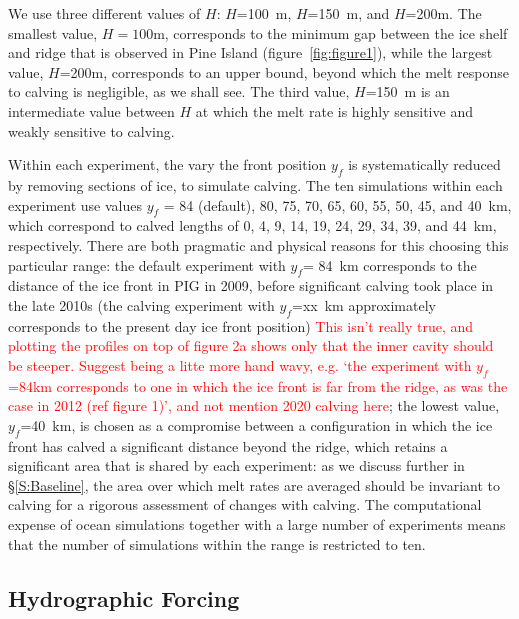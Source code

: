 \documentclass[draft]{agujournal2019}
\newcommand{\red}[1]{\textcolor{red}{#1}}
\begin{document}
We use three different values of $H$: $H$=100~m, $H$=150~m, and $H$=200m. The smallest value, $H = 100$m, corresponds to the minimum gap between the ice shelf and ridge that is observed in Pine Island (figure~\ref{fig:figure1}), while the largest value, $H$=200m, corresponds to an upper bound, beyond which the melt response to calving is negligible, as we shall see. The third value, $H$=150~m is an intermediate value between $H$ at which the melt rate is highly sensitive and weakly sensitive to calving.

Within each experiment, the vary the front position $y_f$ is systematically reduced by removing sections of ice, to simulate calving. The ten simulations within each experiment use values $y_f$ = 84 (default), 80, 75, 70, 65, 60, 55, 50, 45, and 40~km, which correspond to calved lengths of 0, 4, 9, 14, 19, 24, 29, 34, 39, and 44~km, respectively. There are both pragmatic and physical reasons for this choosing this particular range: the default experiment with $y_f$= 84~km corresponds to the distance of the ice front in PIG in 2009, before significant calving took place in the late 2010s (the calving experiment with $y_f$=xx~km approximately corresponds to the present day ice front position) \red{This isn't really true, and plotting the profiles on top of figure 2a shows only that the inner cavity should be steeper. Suggest being a litte more hand wavy, e.g. `the experiment with $y_f$=84km corresponds to one in which the ice front is far from the ridge, as was the case in 2012 (ref figure 1)', and not mention 2020 calving here}; the lowest value, $y_f$=40~km, is chosen as a compromise between a configuration in which the ice front has calved a significant distance beyond the ridge, which retains a significant area that is shared by each experiment: as we discuss further in \S\ref{S:Baseline}, the area over which melt rates are averaged should be invariant to calving for a rigorous assessment of changes with calving. The computational expense of ocean simulations together with a large number of experiments means that the number of simulations within the range is restricted to ten.

\subsection{Hydrographic Forcing}\label{S:Experiment:Hydrography}
\end{document}
